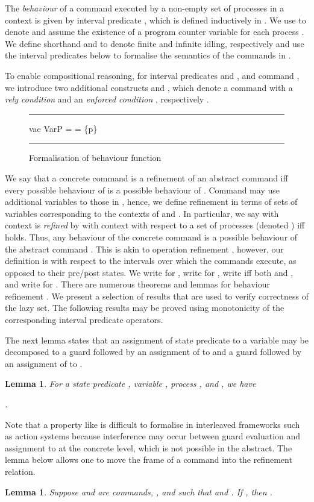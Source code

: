 \documentclass{article}
\def\figrule{\rule{\columnwidth}{0.5pt}}
\theoremstyle{plain}
\newcounter{thm}
\newtheorem{lemma}[thm]{Lemma}
\theoremstyle{definition}
\begin{document}
The \emph{behaviour} of a command  executed by a non-empty set of
processes  in a context  is given by interval
predicate , which is defined inductively in
. We use  to denote  and
assume the existence of a program counter variable  for each
process . We define shorthand  and
 to denote finite and infinite
idling, respectively and use the interval predicates below to
formalise the semantics of the commands in
.

\noindent
To enable compositional reasoning, for interval predicates  and
, and command , we introduce two additional constructs
 and , which denote a command  with a
\emph{rely condition}  and an \emph{enforced condition} ,
respectively \cite{DDH12}.

\begin{figure}[t]
  \figrule \centering \small

  vae \in VarP = \emptysetP = \{p\}

  \figrule
  \caption{Formalisation of behaviour function}
  \label{fig:beh-def}
\end{figure}


We say that a concrete command  is a refinement of an abstract
command  iff every possible behaviour of  is a possible
behaviour of . Command  may use additional variables to those in
, hence, we define refinement in terms of sets of variables
corresponding to the contexts of  and . In particular, we say
 with context  is \emph{refined} by  with context  with
respect to a set of processes  (denoted ) iff
 holds. Thus, any behaviour of the
concrete command  is a possible behaviour of the abstract command
. This is akin to operation refinement \cite{deRoever98}, however,
our definition is with respect to the intervals over which the
commands execute, as opposed to their pre/post states. We write  for , write  for , write  iff both  and , and write 
for . There are numerous theorems and lemmas
for behaviour refinement \cite{DDH12,DD12}. We present a selection of
results that are used to verify correctness of the lazy set. The
following results may be proved using monotonicity of the
corresponding interval predicate operators.



The next lemma states that an assignment of state predicate  to a
variable  may be decomposed to a guard  followed by an
assignment of  to  and a guard  followed by an
assignment of  to .
\begin{lemma}
  \label{lem:bool-exp}
  For a state predicate , variable , process , and
  , we have

  .
\end{lemma}
Note that a property like  is difficult to
formalise in interleaved frameworks such as action systems
\cite{BvW99} because interference may occur between guard evaluation
and assignment to  at the concrete level, which is not possible in
the abstract. The lemma below allows one to move the frame of a
command into the refinement relation.
\begin{lemma}
  \label{lem:add-context}
  Suppose  and  are commands, ,  and  such that  and . If , then .
\end{lemma}
\end{document}
